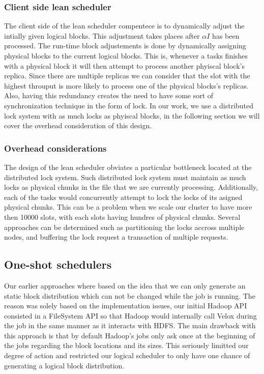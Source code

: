\subsubsection{Client side lean scheduler}
The client side of the lean scheduler compentece is to dynamically adjust the intially given logical blocks. This adjustment takes places after $\alpha I$ has been processed. The run-time block adjustements is done by dynamically assigning physical blocks to the current logical blocks. This is, whenever a tasks finishes with a physical block it will then attempt to process another phyiscal block's replica. Since there are multiple replicas we can consider that the slot with the highest throuput is more likely to process one of the physical blocks's replicas. Also, having this redundancy creates the need to have some sort of synchronization technique in the form of lock. In our work, we use a distributed lock system with as much locks as phyiscal blocks, in the following section we will cover the overhead consideration of this design.


\subsubsection{Overhead considerations}
The design of the lean scheduler obviates a particular bottleneck located at the distributed lock system. Such distributed lock system must maintain as much locks as physical chunks in the file that 
we are currently processing. Additionally, each of the tasks would concurrently attempt to lock the locks of its asigned physical chunks. This can be a problem when we scale our cluster to have more then 10000 slots, with each slots having hundres of physical chunks. Several approaches can be determined such as partitioning the locks accross multiple nodes, and buffering the lock request a transaction of multiple requests.  

\subsection{One-shot schedulers}
Our earlier approaches where based on the idea that we can only generate an static block distribution which can not be changed while the job is running.  The reason was solely based on the implementation issues, our initial Hadoop API consisted in a FileSystem API so that Hadoop would internally call Velox during the job in the same manner as it interacts with HDFS. The main drawback with this approach is that by default Hadoop's jobs only ask once at the beginning of the jobs regarding the block locations and its sizes. This seriously limitted our degree of action and restricted our logical scheduler to only have one chance of generating a logical block distribution. \\

